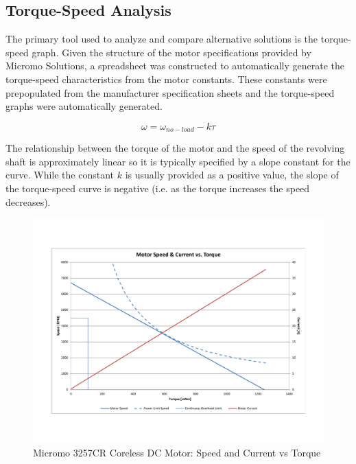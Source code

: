 \subsection{Torque-Speed Analysis} %
\label{sub:torque_speed_analysis}
The primary tool used to analyze and compare alternative solutions is the torque-speed graph. Given the structure of the motor specifications provided by Micromo Solutions, a spreadsheet was constructed to automatically generate the torque-speed characteristics from the motor constants. These constants were prepopulated from the manufacturer specification sheets and the torque-speed graphs were automatically generated. 

\begin{equation}
	\omega = \omega_{no-load} - k\tau
\end{equation}

The relationship between the torque of the motor and the speed of the revolving shaft is approximately linear so it is typically specified by a slope constant for the curve. While the constant $k$ is usually provided as a positive value, the slope of the torque-speed curve is negative (i.e. as the torque increases the speed decreases). 

\begin{figure}[!ht]
	\begin{center}
    \includegraphics[trim = 20mm 30mm 20mm 30mm,clip,width=15cm]{fig/design/motor1.pdf}
	\end{center}
  \caption{Micromo 3257CR Coreless DC Motor: Speed and Current vs Torque}
\end{figure}

